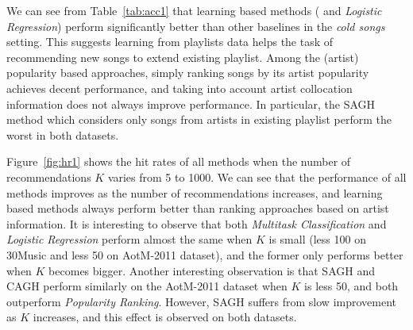We can see from Table~\ref{tab:acc1} that learning based methods (
and {\it Logistic Regression}) perform significantly better than other baselines in the \emph{cold songs} setting.
This suggests learning from playlists data helps the task of recommending new songs to extend existing playlist.
Among the (artist) popularity based approaches, 
simply ranking songs by its artist popularity achieves decent performance,
and taking into account artist collocation information does not always improve performance.
In particular, the SAGH method which considers only songs from artists in existing playlist
perform the worst in both datasets.

Figure~\ref{fig:hr1} shows the hit rates of all methods when the number of recommendations $K$ varies from 5 to 1000.
We can see that the performance of all methods improves as the number of recommendations increases,
and learning based methods always perform better than ranking approaches based on artist information.
It is interesting to observe that both {\it Multitask Classification} and {\it Logistic Regression} perform 
almost the same when $K$ is small (less 100 on 30Music and less 50 on AotM-2011 dataset), 
and the former only performs better when $K$ becomes bigger.
Another interesting observation is that SAGH and CAGH perform similarly on the AotM-2011 dataset when $K$
is less 50, and both outperform {\it Popularity Ranking}. However, SAGH suffers from slow improvement
as $K$ increases, and this effect is observed on both datasets.

